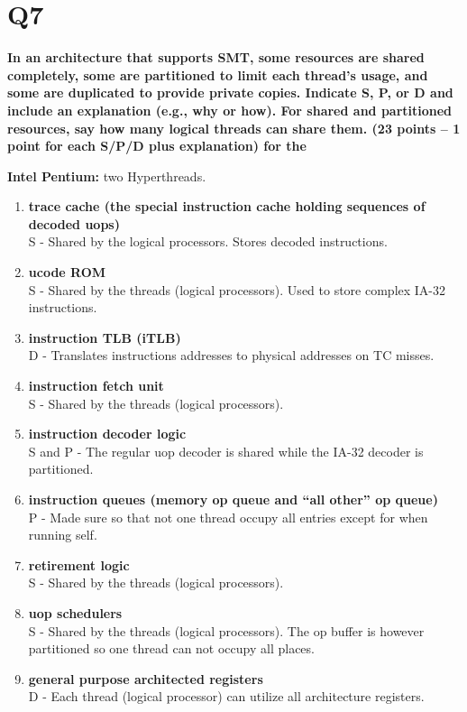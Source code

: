 \documentclass[a4paper]{article}
\begin{document}
\section*{Q7}
\large{\textbf{
In an architecture that supports SMT, some resources are shared completely, some are partitioned to limit each thread’s usage, and some are duplicated to provide private copies. Indicate S, P, or D and include an explanation (e.g., why or how). For shared and partitioned resources, say how many logical threads can share them. (23 points -- 1 point for each S/P/D plus explanation) for the \\}}

\textbf{Intel Pentium:} two Hyperthreads.
\begin{enumerate}
\item    
\textbf{trace cache (the special instruction cache holding sequences of decoded uops)\\}
S - Shared by the logical processors. Stores decoded instructions.
\item
\textbf{ucode ROM\\}
S - Shared by the threads (logical processors). Used to store complex IA-32 instructions.
\item
\textbf{instruction TLB (iTLB)\\}
D - Translates instructions addresses to physical addresses on TC misses.
\item
\textbf{instruction fetch unit\\}
S - Shared by the threads (logical processors).
\item
\textbf{instruction decoder logic\\}
S and P - The regular uop decoder is shared while the IA-32 decoder is partitioned.
\item
\textbf{instruction queues (memory op queue and “all other” op queue)\\}
P - Made sure so that not one thread occupy all entries except for when running self.
\item
\textbf{retirement logic\\}
S - Shared by the threads (logical processors).
\item
\textbf{uop schedulers\\}
S - Shared by the threads (logical processors). The op buffer is however partitioned so one thread can not occupy all places.
\item
\textbf{general purpose architected registers\\}
D - Each thread (logical processor) can utilize all architecture registers.

\end{enumerate}
\end{document}

